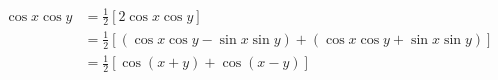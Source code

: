\documentclass{article}
\begin{document}
  \begin{align*}
    \cos x \cos y &= \frac{1}{2} [2 \cos x \cos y] \\
    &= \frac{1}{2} [(\cos x \cos y - \sin x \sin y) + (\cos x \cos y + \sin x \sin y)] \\
    &= \frac{1}{2} [\cos (x + y) + \cos (x - y)]
  \end{align*}
\end{document}
